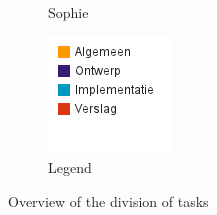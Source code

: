 \documentclass[i3]{oss}
\begin{document}
\begin{figure}[h!]
\begin{subfigure}[hb]{0.20\textwidth}
                \caption{Sophie}
        \end{subfigure}%
                \begin{subfigure}[hb]{0.20\textwidth}
                \centering
                \includegraphics[width=\textwidth]{legende}
                \caption{Legend}
        \end{subfigure}%


 \caption{Overview of the division of tasks}
\label{fig:werkverdeling}
\end{figure}

\end{document}
